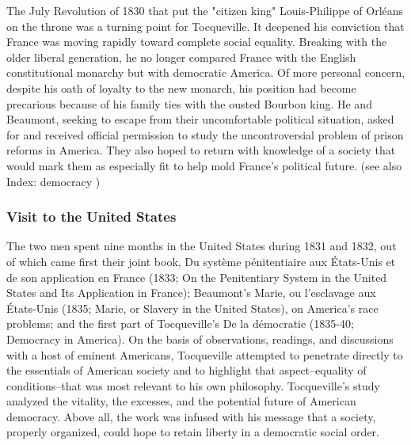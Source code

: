\documentclass[12pt]{article}
\begin{document}
                                      The July Revolution of 1830 that put the "citizen king" Louis-Philippe
                                      of Orl\'{e}ans on the throne was a turning point for Tocqueville. It
                                      deepened his conviction that France was moving rapidly toward
                                      complete social equality. Breaking with the older liberal generation,
                                      he no longer compared France with the English constitutional
                                      monarchy but with democratic America. Of more personal concern,
                                      despite his oath of loyalty to the new monarch, his position had
                                      become precarious because of his family ties with the ousted Bourbon
                                      king. He and Beaumont, seeking to escape from their uncomfortable
                                      political situation, asked for and received official permission to
                                      study the uncontroversial problem of prison reforms in America. They
                                      also hoped to return with knowledge of a society that would mark
                                      them as especially fit to help mold France's political future. (see also
                                      Index: democracy ) 




\subsubsection{Visit to the United States}
The two men spent nine months in the United States during 1831 and
                                      1832, out of which came first their joint book, Du syst\`{e}me
                                      p\'{e}nitentiaire aux \'{E}tats-Unis et de son application en France
                                      (1833; On the Penitentiary System in the United States and Its
                                      Application in France); Beaumont's Marie, ou l'esclavage aux
                                      \'{E}tats-Unis (1835; Marie, or Slavery in the United States), on
                                      America's race problems; and the first part of Tocqueville's De la
                                      d\'{e}mocratie (1835-40; Democracy in America). On the basis of
                                      observations, readings, and discussions with a host of eminent
                                      Americans, Tocqueville attempted to penetrate directly to the
                                      essentials of American society and to highlight that aspect--equality
                                      of conditions--that was most relevant to his own philosophy.
                                      Tocqueville's study analyzed the vitality, the excesses, and the
                                      potential future of American democracy. Above all, the work was
                                      infused with his message that a society, properly organized, could
                                      hope to retain liberty in a democratic social order. 
\end{document}

